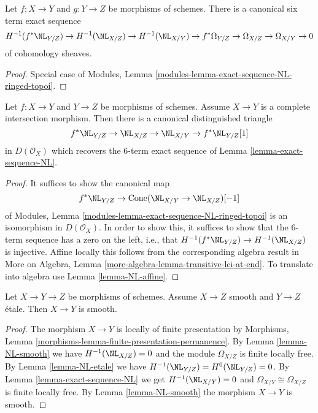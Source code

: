 \begin{lemma}
\label{lemma-exact-sequence-NL}
Let $f : X \to Y$ and $g : Y \to Z$ be morphisms of schemes.
There is a canonical six term exact sequence
$$
H^{-1}(f^*\NL_{Y/Z}) \to
H^{-1}(\NL_{X/Z}) \to
H^{-1}(\NL_{X/Y}) \to
f^*\Omega_{Y/Z} \to \Omega_{X/Z} \to \Omega_{X/Y} \to 0
$$
of cohomology sheaves.
\end{lemma}

\begin{proof}
Special case of
Modules, Lemma \ref{modules-lemma-exact-sequence-NL-ringed-topoi}.
\end{proof}

\begin{lemma}
\label{lemma-get-triangle-NL}
Let $f : X \to Y$ and $Y \to Z$ be morphisms of schemes. Assume
$X \to Y$ is a complete intersection morphism. Then there is
a canonical distinguished triangle
$$
f^*\NL_{Y/Z} \to \NL_{X/Z} \to \NL_{X/Y} \to f^*\NL_{Y/Z}[1]
$$
in $D(\mathcal{O}_X)$ which recovers the $6$-term exact sequence of
Lemma \ref{lemma-exact-sequence-NL}.
\end{lemma}

\begin{proof}
It suffices to show the canonical map
$$
f^*\NL_{Y/Z} \to \text{Cone}(\NL_{X/Y} \to \NL_{X/Z})[-1]
$$
of Modules, Lemma \ref{modules-lemma-exact-sequence-NL-ringed-topoi}
is an isomorphism in $D(\mathcal{O}_X)$. In order to show this, it
suffices to show that the $6$-term sequence has
a zero on the left, i.e., that $H^{-1}(f^*\NL_{Y/Z}) \to H^{-1}(\NL_{X/Z})$
is injective. Affine locally this follows from the corresponding
algebra result in More on Algebra, Lemma
\ref{more-algebra-lemma-transitive-lci-at-end}.
To translate into algebra use Lemma \ref{lemma-NL-affine}.
\end{proof}

\begin{lemma}
\label{lemma-smooth-etale-permanence}
Let $X \to Y \to Z$ be morphisms of schemes. Assume $X \to Z$ smooth
and $Y \to Z$ \'etale. Then $X \to Y$ is smooth.
\end{lemma}

\begin{proof}
The morphism $X \to Y$ is locally of finite presentation by
Morphisms, Lemma \ref{morphisms-lemma-finite-presentation-permanence}.
By Lemma \ref{lemma-NL-smooth} we have $H^{-1}(\NL_{X/Z}) = 0$
and the module $\Omega_{X/Z}$ is finite locally free.
By Lemma \ref{lemma-NL-etale} we have
$H^{-1}(\NL_{Y/Z}) = H^0(\NL_{Y/Z}) = 0$.
By Lemma \ref{lemma-exact-sequence-NL} we get
$H^{-1}(\NL_{X/Y}) = 0$ and $\Omega_{X/Y} \cong \Omega_{X/Z}$
is finite locally free.
By Lemma \ref{lemma-NL-smooth} the morphism $X \to Y$ is smooth.
\end{proof}

